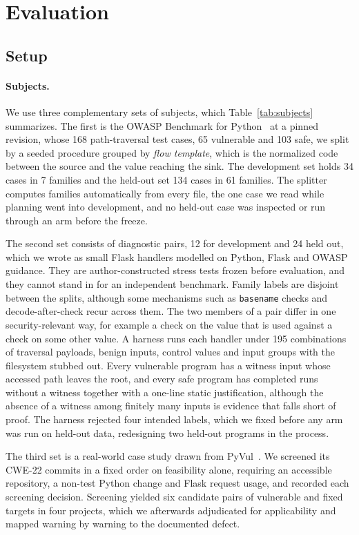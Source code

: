 \section{Evaluation}
\label{sec:eval}

\subsection{Setup}
\paragraph{Subjects.}
We use three complementary sets of subjects, which Table~\ref{tab:subjects} summarizes. The first is the OWASP Benchmark for Python~\cite{owaspbench} at a pinned revision, whose 168 path-traversal test cases, 65 vulnerable and 103 safe, we split by a seeded procedure grouped by \emph{flow template}, which is the normalized code between the source and the value reaching the sink. The development set holds 34 cases in 7 families and the held-out set 134 cases in 61 families. The splitter computes families automatically from every file, the one case we read while planning went into development, and no held-out case was inspected or run through an arm before the freeze.

The second set consists of diagnostic pairs, 12 for development and 24 held out, which we wrote as small Flask handlers modelled on Python, Flask and OWASP guidance. They are author-constructed stress tests frozen before evaluation, and they cannot stand in for an independent benchmark. Family labels are disjoint between the splits, although some mechanisms such as \texttt{basename} checks and decode-after-check recur across them. The two members of a pair differ in one security-relevant way, for example a check on the value that is used against a check on some other value. A harness runs each handler under 195 combinations of traversal payloads, benign inputs, control values and input groups with the filesystem stubbed out. Every vulnerable program has a witness input whose accessed path leaves the root, and every safe program has completed runs without a witness together with a one-line static justification, although the absence of a witness among finitely many inputs is evidence that falls short of proof. The harness rejected four intended labels, which we fixed before any arm was run on held-out data, redesigning two held-out programs in the process.

The third set is a real-world case study drawn from PyVul~\cite{pyvul}. We screened its CWE-22 commits in a fixed order on feasibility alone, requiring an accessible repository, a non-test Python change and Flask request usage, and recorded each screening decision. Screening yielded six candidate pairs of vulnerable and fixed targets in four projects, which we afterwards adjudicated for applicability and mapped warning by warning to the documented defect.

